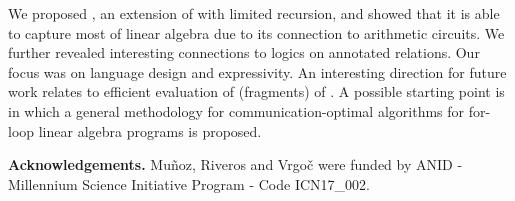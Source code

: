 We proposed \langfor, an extension of \lang with limited recursion,
and showed that it is able to capture most of linear algebra due to its
connection to arithmetic circuits. We further revealed interesting connections
to logics on annotated relations. Our focus was on language design and
expressivity. An interesting direction for future work relates to efficient
evaluation of (fragments) of \langfor. A possible starting point is \cite{Christ_2013}
in which a general methodology for communication-optimal algorithms
for for-loop linear algebra programs is proposed.

\medskip
\noindent \textbf{Acknowledgements.} Mu\~noz, Riveros and Vrgo\v{c} were funded by ANID - Millennium Science Initiative Program - Code ICN17\_002.
